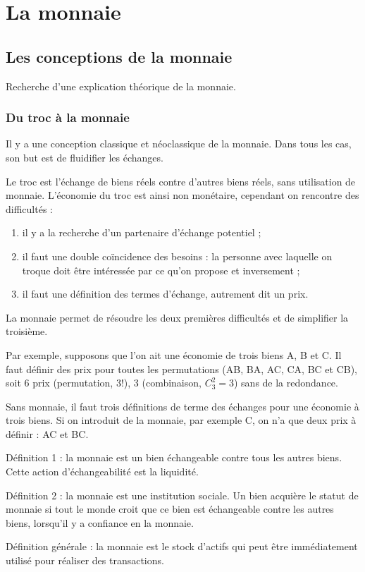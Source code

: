 \chapter{La monnaie}

\section{Les conceptions de la monnaie}

Recherche d'une explication théorique de la monnaie.

	\subsection{Du troc à la monnaie}
	
	Il y a une conception classique et néoclassique de la monnaie. Dans tous les cas, son but est de fluidifier les échanges.
	
	Le troc est l'échange de biens réels contre d'autres biens réels, sans utilisation de monnaie. L'économie du troc est ainsi non monétaire, cependant on rencontre des difficultés :
	
	\begin{enumerate}
		\item il y a la recherche d'un partenaire d'échange potentiel ;
		\item il faut une double coïncidence des besoins : la personne avec laquelle on troque doit être intéressée par ce qu'on propose et inversement ;
		\item il faut une définition des termes d'échange, autrement dit un prix.
	\end{enumerate}
	
	La monnaie permet de résoudre les deux premières difficultés et de simplifier la troisième.
	
	Par exemple, supposons que l'on ait une économie de trois biens A, B et C. Il faut définir des prix pour toutes les permutations (AB, BA, AC, CA, BC et CB), soit 6 prix (permutation, $3!$), 3 (combinaison, $C_3^2 = 3$) sans de la redondance.
	
	Sans monnaie, il faut trois définitions de terme des échanges pour une économie à trois biens. Si on introduit de la monnaie, par exemple C, on n'a que deux prix à définir : AC et BC.
	
	Définition 1 : la monnaie est un bien échangeable contre tous les autres biens. Cette action d'échangeabilité est la liquidité.
	
	Définition 2 : la monnaie est une institution sociale. Un bien acquière le statut de monnaie si tout le monde croit que ce bien est échangeable contre les autres biens, lorsqu'il y a confiance en la monnaie.
	
	Définition générale : la monnaie est le stock d'actifs qui peut être immédiatement utilisé pour réaliser des transactions.